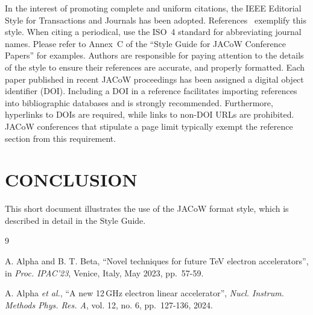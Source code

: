\documentclass[%
               ]{jacow}
\begin{document}
In the interest of promoting complete and uniform citations, 
the IEEE Editorial Style for Transactions and Journals has been adopted. 
References~\cite{ref:jacow-paper, ref:journal-paper} exemplify this style. 
When citing a periodical, use the ISO~4 standard for abbreviating journal names. 
Please refer to Annex~C of the “Style Guide for JACoW Conference Papers” for examples. 
Authors are responsible for paying attention to the details of the style to ensure their references are 
accurate, and properly formatted. 
Each paper published in recent JACoW proceedings has been assigned a digital object identifier (DOI). Including a DOI in a reference facilitates importing references into bibliographic databases and is strongly recommended. 
Furthermore, hyperlinks to DOIs are required, while links to non-DOI URLs are prohibited. 
JACoW conferences that stipulate a page limit typically exempt the reference section from this requirement.

\section{CONCLUSION}

This short document illustrates the use of the JACoW format style, which is described in detail in the Style Guide. 

\begin{thebibliography}{9} 		%
	
		A. Alpha and B. T. Beta, 
		“Novel techniques for future TeV electron accelerators”, 
		in \textit{Proc. IPAC’23}, Venice, Italy, May 2023, pp.~57-59. 
	
		A. Alpha \textit{et al.}, 
		“A new 12\,GHz electron linear accelerator”, 
		\textit{Nucl. Instrum. Methods Phys. Res. A}, vol. 12, no. 6, pp.~127-136, 2024. 
		
\end{thebibliography}
\end{document}
